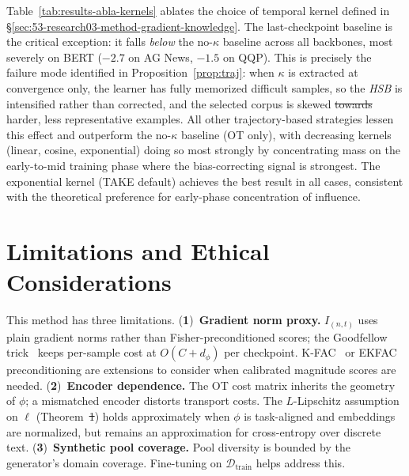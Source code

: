 \documentclass[12pt, a4paper, twoside]{book}
\makeatletter
\numberwithin{equation}{chapter}
\theoremstyle{plain}
\theoremstyle{definition}
\theoremstyle{remark}
\newenvironment{foldable}{}{}
\providecommand{\DIFaddtex}[1]{{\protect\color{blue}\uwave{#1}}} %
\providecommand{\DIFdeltex}[1]{{\protect\color{red}\sout{#1}}} %
\providecommand{\DIFaddbegin}{} %
\providecommand{\DIFaddend}{} %
\providecommand{\DIFdelbegin}{} %
\providecommand{\DIFdelend}{} %
\providecommand{\DIFadd}[1]{\texorpdfstring{\DIFaddtex{#1}}{#1}} %
\providecommand{\DIFdel}[1]{\texorpdfstring{\DIFdeltex{#1}}{}} %
\newcommand{\DIFscaledelfig}{0.5}
\newlength{\DIFdelgraphicswidth} %
\newlength{\DIFdelgraphicsheight} %
\newcommand{\DIFaddincludegraphics}[2][]{{\color{blue}\fbox{\DIFOincludegraphics[#1]{#2}}}} %
\newcommand{\DIFdelincludegraphics}[2][]{%
\sbox{\DIFdelgraphicsbox}{\DIFOincludegraphics[#1]{#2}}%
\settoboxwidth{\DIFdelgraphicswidth}{\DIFdelgraphicsbox} %
\settoboxtotalheight{\DIFdelgraphicsheight}{\DIFdelgraphicsbox} %
\scalebox{\DIFscaledelfig}{%
\parbox[b]{\DIFdelgraphicswidth}{\usebox{\DIFdelgraphicsbox}\\[-\baselineskip] \rule{\DIFdelgraphicswidth}{0em}}\llap{\resizebox{\DIFdelgraphicswidth}{\DIFdelgraphicsheight}{%
\setlength{\unitlength}{\DIFdelgraphicswidth}%
\begin{picture}(1,1)%
\thicklines\linethickness{2pt} %
{\color[rgb]{1,0,0}\put(0,0){\framebox(1,1){}}}%
{\color[rgb]{1,0,0}\put(0,0){\line( 1,1){1}}}%
{\color[rgb]{1,0,0}\put(0,1){\line(1,-1){1}}}%
\end{picture}%
}\hspace*{3pt}}} %
} %
\DeclareRobustCommand{\DIFaddbegin}{\DIFOaddbegin \let\includegraphics\DIFaddincludegraphics} %
\DeclareRobustCommand{\DIFaddend}{\DIFOaddend \let\includegraphics\DIFOincludegraphics} %
\DeclareRobustCommand{\DIFdelbegin}{\DIFOdelbegin \let\includegraphics\DIFdelincludegraphics} %
\DeclareRobustCommand{\DIFdelend}{\DIFOaddend \let\includegraphics\DIFOincludegraphics} %
\let\sout@orig\sout %
\renewcommand{\sout}[1]{\ifmmode\text{\sout@orig{\ensuremath{#1}}}\else\sout@orig{#1}\fi} %
\makeatother
\begin{document}
\begin{foldable} Table~\ref{tab:results-abla-kernels} ablates the choice of temporal kernel defined in \S\ref{sec:53-research03-method-gradient-knowledge}.
  The last-checkpoint baseline is the critical exception: it falls \textit{below} the no-$\kappa$ baseline across all backbones, most severely on BERT ($-2.7$ on AG News, $-1.5$ on QQP).
  This is precisely the failure mode identified in Proposition~\ref{prop:traj}: when $\kappa$ is extracted at convergence only, the learner has fully memorized difficult samples, so the \textit{\acl{HSB}} is intensified rather than corrected, and the selected corpus is skewed \DIFdelbegin \DIFdel{towards }\DIFdelend \DIFaddbegin \DIFadd{toward }\DIFaddend harder, less representative examples.
  All other trajectory-based strategies lessen this effect and outperform the no-$\kappa$ baseline (OT only), with decreasing kernels (linear, cosine, exponential) doing so most strongly by concentrating mass on the early-to-mid training phase where the bias-correcting signal is strongest.
  The exponential kernel (TAKE default) achieves the best result in all cases, consistent with the theoretical preference for early-phase concentration of influence.
\end{foldable} \section{Limitations and Ethical Considerations} \label{sec:55-research03-limitations}

\begin{foldable} This method has three limitations.
  (\textbf{1})~\textbf{Gradient norm proxy.}
  $I_{(n,t)}$ uses plain gradient norms rather than Fisher-preconditioned scores; the Goodfellow trick~\cite{goodfellow2015efficient} keeps per-sample cost at $O(C + d_\phi)$ per checkpoint.
  K-FAC~\cite{martens2015optimizing} or EKFAC~\cite{george2018fast} preconditioning are extensions to consider when calibrated magnitude scores are needed.
  (\textbf{2})~\textbf{Encoder dependence.}
  The \ac{OT} cost matrix inherits the geometry of $\phi$; a mismatched encoder distorts transport costs.
  The $L$-Lipschitz assumption on $\ell$ (Theorem~\DIFdelbegin \DIFdel{1}\DIFdelend \DIFaddbegin \DIFadd{\ref{thm:gap}}\DIFaddend ) holds approximately when $\phi$ is task-aligned and embeddings are normalized, but remains an approximation for cross-entropy over discrete text.
  (\textbf{3})~\textbf{Synthetic pool coverage.}
  Pool diversity is bounded by the generator's domain coverage.
  Fine-tuning on $\mathcal{D}_\text{train}$ helps address this.
\end{foldable}
\end{document}
